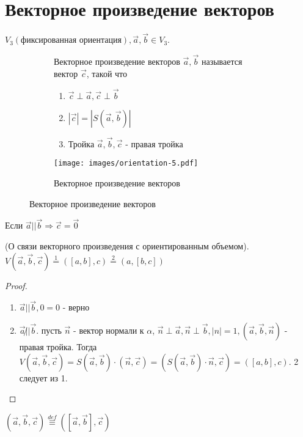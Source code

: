 \section{Векторное произведение векторов}
\(V_3(\text{фиксированная ориентация}), \vec{a}, \vec{b} \in V_3\).
\begin{definition}
	\begin{figure}[h]
		\begin{subfigure}[t!]{0.6\linewidth}
			Векторное произведение векторов $\vec{a}, \vec{b}$ называется вектор $\vec{c}$, такой что 
			\begin{enumerate}
				\item $\vec{c}\perp\vec{a}, \vec{c}\perp\vec{b}$
				\item \(|\vec{c}| = |S(\vec{a}, \vec{b})|\)
				\item Тройка $\vec{a}, \vec{b}, \vec{c}$ - правая тройка
			\end{enumerate}
		\end{subfigure}
		\begin{subfigure}[b!]{0.4\linewidth}
			\centering
			\texttt{[image: images/orientation-5.pdf]}
			\caption*{Векторное произведение векторов}
			\label{Orientation5}
		\end{subfigure}
	\end{figure}
	
\end{definition}
\begin{note}
	Если $\vec{a} || \vec{b} \Longrightarrow \vec{c} = \vec{0}$
\end{note}
\begin{theorem}
	(О связи векторного произведения с ориентированным объемом). \(V(\vec{a}, \vec{b}, \vec{c}) \overset{1}{=} ([a, b], c) \overset{2}{=} (a, [b, c])\)
\end{theorem}
\begin{proof}
	\begin{enumerate}
		\item $\vec{a} || \vec{b}, 0 = 0$ - верно 
		\item \(\vec{a}\not||\vec{b}\). пусть $\vec{n}$ - вектор нормали к $\alpha$, $\vec{n}\perp \vec{a}, \vec{n}\perp \vec{b}, |n| = 1, (\vec{a}, \vec{b}, \vec{n})$ - правая тройка. Тогда \(V(\vec{a}, \vec{b}, \vec{c}) = S(\vec{a}, \vec{b})\cdot(\vec{n}, \vec{c}) = (S(\vec{a}, \vec{b})\cdot\vec{n}, \vec{c}) = ([a,b],c)\). 2 следует из 1.
	\end{enumerate}
\end{proof}
\begin{note}
	\((\vec{a}, \vec{b}, \vec{c}) \overset{def}{\equiv}([\vec a,\vec b], \vec c)\)
\end{note}
